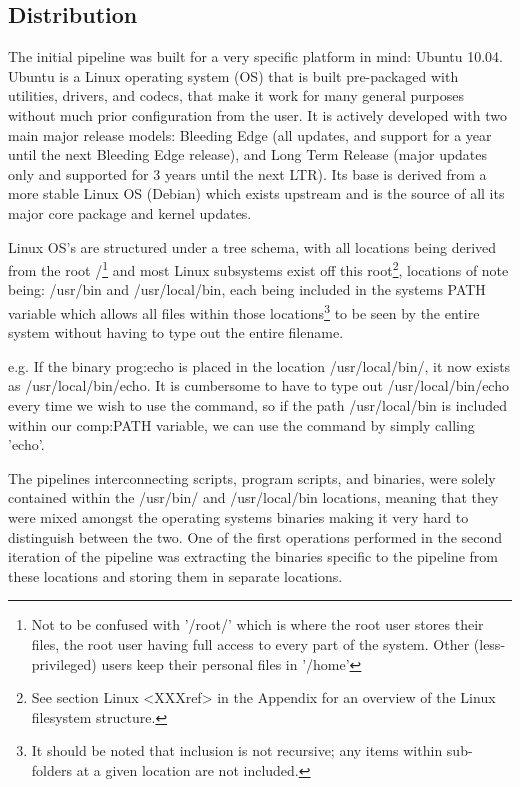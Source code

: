 \subsection{Distribution}

The initial pipeline was built for a very specific platform in mind: Ubuntu 10.04. Ubuntu is a Linux operating system (OS) that is built pre-packaged with utilities, drivers, and codecs, that make it work for many general purposes without much prior configuration from the user. It is actively developed with two main major release models: Bleeding Edge (all updates, and support for a year until the next Bleeding Edge release), and Long Term Release (major updates only and supported for 3 years until the next LTR).  Its base is derived from a more stable Linux OS (Debian) which exists upstream and is the source of all its major core package and kernel updates.

Linux OS's are structured under a tree schema, with all locations being derived from the root /\footnote{Not to be confused with '/root/' which is where the root user stores their files, the root user having full access to every part of the system. Other (less-privileged) users keep their personal files in '/home'} and most Linux subsystems exist off this root\footnote{See section Linux <XXXref> in the Appendix for an overview of the Linux filesystem structure.}, locations of note being: /usr/bin and /usr/local/bin, each being included in the systems PATH variable which allows all files within those locations\footnote{It should be noted that inclusion is not recursive; any items within sub-folders at a given location are not included.} to be seen by the entire system without having to type out the entire filename.

e.g. If the binary \gls{prog:echo} is placed in the location /usr/local/bin/, it now exists as /usr/local/bin/echo. It is cumbersome to have to type out /usr/local/bin/echo every time we wish to use the command, so if the path /usr/local/bin is included within our \gls{comp:PATH} variable, we can use the command by simply calling 'echo'.

The pipelines interconnecting scripts, program scripts, and binaries, were solely contained within the /usr/bin/ and /usr/local/bin locations, meaning that they were mixed amongst the operating systems binaries making it very hard to distinguish between the two. One of the first operations performed in the second iteration of the pipeline was extracting the binaries specific to the pipeline from these locations and storing them in separate locations. 

